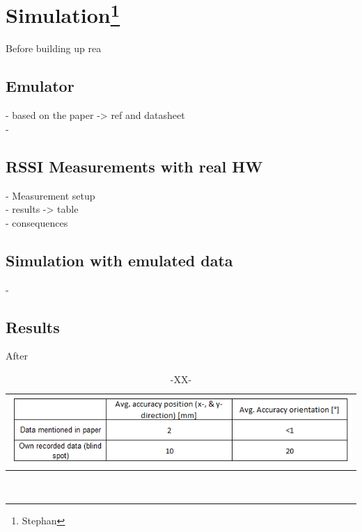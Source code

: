 \section[Simulation]{Simulation\footnote{Stephan}}
Before building up  rea

\subsection{Emulator}
- based on the paper -> ref and datasheet\\
- 

\subsection{RSSI Measurements with real HW}
- Measurement setup \\
- results -> table \\
- consequences\\

\subsection{Simulation with emulated data}
- 

\subsection{Results}
After 
\begin{table}[!htbp]
\centering
\caption{-XX-}
\begin{tabular}{c}
\includegraphics[width = 16cm]{Pictures/Table_Results}
\end{tabular}
\label{-XX-}
\end{table}\\

 
 